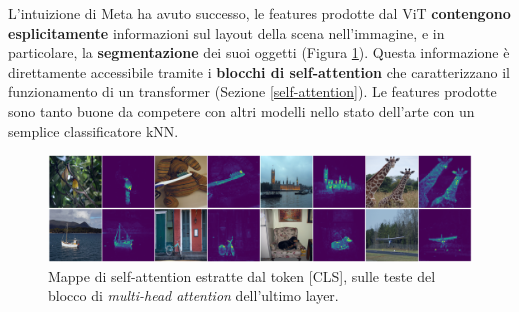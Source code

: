 L'intuizione di Meta ha avuto successo, le features prodotte dal ViT \textbf{contengono esplicitamente} informazioni sul layout della scena nell'immagine, e in particolare, la \textbf{segmentazione} dei suoi oggetti (Figura \ref{fig:dino_attention}). Questa informazione è direttamente accessibile tramite i \textbf{blocchi di self-attention} che caratterizzano il funzionamento di un transformer (Sezione \ref{self-attention}). Le features prodotte sono tanto buone da competere con altri modelli nello stato dell'arte con un semplice classificatore kNN.

\vspace{5mm}

\begin{figure}[t]
    \centering
    \includegraphics[width=\textwidth]{Immagini/ssl/dino_attention.png}
    \caption{Mappe di self-attention estratte dal token [CLS], sulle teste del blocco di \textit{multi-head attention} dell'ultimo layer.}
    \label{fig:dino_attention}
\end{figure}

